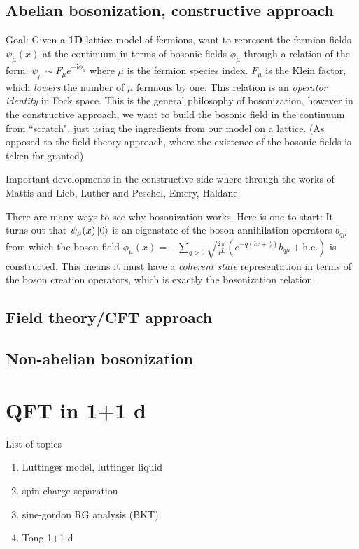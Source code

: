 \documentclass{article}
\renewcommand{\i}{\mathrm{i}}
\renewcommand{\i}{\mathrm{i}}
\begin{document}
\subsection{Abelian bosonization, constructive approach}
Goal: Given a \textbf{1D} lattice model of fermions, want to represent the fermion fields $\psi_{\mu}(x)$ at the continuum in terms of bosonic fields $\phi_\mu$ through a relation of the form: $\psi_{\mu} \sim F_{\mu} e^{-\i \phi_{\mu}}$ where $\mu$ is the fermion species index. $F_{\mu}$ is the Klein factor, which \emph{lowers} the number of $\mu$ fermions by one. This relation is an \emph{operator identity} in Fock space.
This is the general philosophy of bosonization, however in the constructive approach, we want to build the bosonic field in the continuum from ``scratch", just using the ingredients from our model on a lattice. (As opposed to the field theory approach, where the existence of the bosonic fields is taken for granted)

Important developments in the constructive side where through the works of Mattis and Lieb, Luther and Peschel, Emery, Haldane.

There are many ways to see why bosonization works. Here is one to start: It turns out that $\psi_{\mu} (x) \ket{0}$ is an eigenstate of the boson annihilation operators $b_{q\mu}$ from which the boson field $\phi_{\mu} (x) = - \sum_{q>0} \sqrt{\frac{2\pi}{qL}}\left(e^{-q(\i x + \frac{a}{2})} b_{q\mu} + \text{h.c.} \right)$ is constructed. This means it must have a \emph{coherent state} representation in terms of the boson creation operators, which is exactly the bosonization relation.

\subsection{Field theory/CFT approach}
\subsection{Non-abelian bosonization}
\section{QFT in 1+1 d}
List of topics
\begin{enumerate}
    \item Luttinger model, luttinger liquid
    \item spin-charge separation
    \item sine-gordon RG analysis (BKT)
    \item Tong 1+1 d
\end{enumerate}
\end{document}
